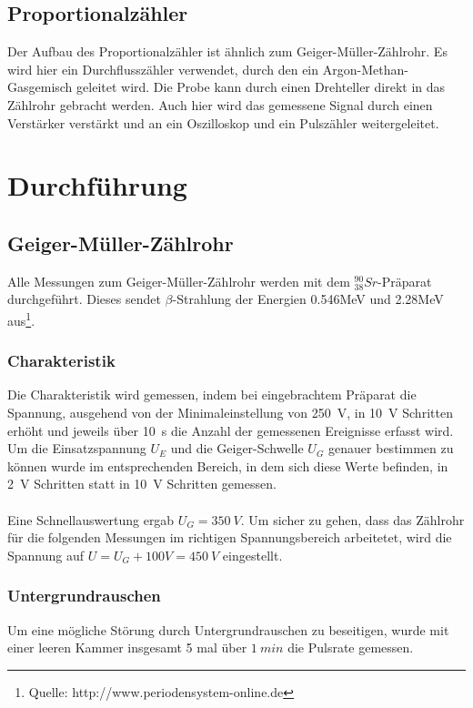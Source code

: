 \documentclass[12pt,a4paper]{article}
\begin{document}
\subsection{Proportionalzähler}
Der Aufbau des Proportionalzähler ist ähnlich zum Geiger-Müller-Zählrohr. Es wird hier ein Durchflusszähler verwendet, durch den ein Argon-Methan-Gasgemisch geleitet wird. Die Probe kann durch einen Drehteller direkt in das Zählrohr gebracht werden. Auch hier wird das gemessene Signal durch einen Verstärker verstärkt und an ein Oszilloskop und ein Pulszähler weitergeleitet.
\section{Durchführung}
\subsection{Geiger-Müller-Zählrohr}
Alle Messungen zum Geiger-Müller-Zählrohr werden mit dem $_{38}^{90}Sr$-Präparat durchgeführt. Dieses sendet $\beta$-Strahlung der Energien 0.546MeV und 2.28MeV aus\footnote{Quelle: http://www.periodensystem-online.de}.
\subsubsection{Charakteristik}
Die Charakteristik wird gemessen, indem bei eingebrachtem Präparat die Spannung, ausgehend von der Minimaleinstellung von \SI{250}{V}, in \SI{10}{V} Schritten erhöht und jeweils über \SI{10}{s} die Anzahl der gemessenen Ereignisse erfasst wird.\\
Um die Einsatzspannung $U_E$ und die Geiger-Schwelle $U_G$ genauer bestimmen zu können wurde im entsprechenden Bereich, in dem sich diese Werte befinden, in \SI{2}{V} Schritten statt in \SI{10}{V} Schritten gemessen.\\
\\Eine Schnellauswertung ergab $U_G = \SI{350}{V}$. Um sicher zu gehen, dass das Zählrohr für die folgenden Messungen im richtigen Spannungsbereich arbeitetet, wird die Spannung auf $U = U_G + 100V = \SI{450}{V}$ eingestellt.

\subsubsection{Untergrundrauschen}
Um eine mögliche Störung durch Untergrundrauschen zu beseitigen, wurde mit einer leeren Kammer insgesamt 5 mal über $\SI{1}{min}$ die Pulsrate gemessen.
\end{document}
